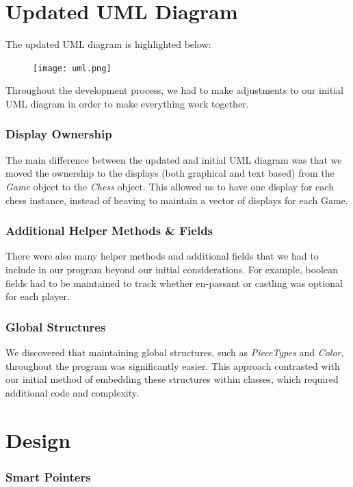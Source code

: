\documentclass[12pt]{article}
\begin{document}
\section*{Updated UML Diagram}
The updated UML diagram is highlighted below:
\begin{figure}[H]
	\centering
	\texttt{[image: uml.png]}
	\label{}
\end{figure}


Throughout the development process, 
we had to make adjustments to our 
initial UML diagram in order to make 
everything work together.

\subsubsection*{Display Ownership}
The main difference between the updated and initial UML diagram was that we moved the ownership to the displays (both graphical and text based) from the \textit{Game} object to the \textit{Chess} object. This allowed us to have one display for each chess instance, instead of heaving to maintain a vector of displays for each Game.

\subsubsection*{Additional Helper Methods \& Fields}
There were also many helper methods and additional fields that we had to include in our program beyond our initial considerations. For example, boolean fields had to be maintained to track whether en-passant or castling was optional for each player.

\subsubsection*{Global Structures}
We discovered that maintaining global structures, such as \textit{PieceTypes} and \textit{Color}, throughout the program was significantly easier. This approach contrasted with our initial method of embedding these structures within classes, which required additional code and complexity.


\section*{Design}

\subsubsection*{Smart Pointers}
\end{document}
